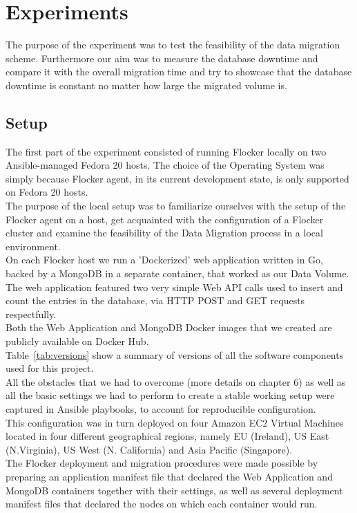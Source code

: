 \documentclass{article}
\begin{document}
\clearpage
\section{Experiments}
The purpose of the experiment was to test the feasibility of the data migration scheme. Furthermore our aim was to measure the database downtime and compare it with the overall migration time and try to showcase that the database downtime is constant no matter how large the migrated volume is.

\subsection{Setup}
The first part of the experiment consisted of running Flocker locally on two Ansible-managed Fedora 20 hosts. The choice of the Operating System was simply because Flocker agent, in its current development state, is only supported on Fedora 20 hosts.\\
The purpose of the local setup was to familiarize ourselves with the setup of the Flocker agent on a host, get acquainted with the configuration of a Flocker cluster and examine the feasibility of the Data Migration process in a local environment. \\
On each Flocker host we run a 'Dockerized' web application written in Go, backed by a MongoDB in a separate container, that worked as our Data Volume.\\
The web application featured two very simple Web API calls used to insert and count the entries in the database, via HTTP POST and GET requests respectfully.\\
Both the Web Application and MongoDB Docker images that we created are publicly available on Docker Hub.\\
Table~\ref{tab:versions} show a summary of versions of all the software components used for this project.\\
All the obstacles that we had to overcome (more details on chapter 6) as well as all the basic settings we had to perform to create a stable working setup were captured in Ansible playbooks, to account for reproducible configuration.\\
This configuration was in turn deployed on four Amazon EC2 \cite{ec2} Virtual Machines located in four different geographical regions, namely EU (Ireland), US East (N.Virginia), US West (N. California) and Asia Pacific (Singapore).\\
The Flocker deployment and migration procedures were made possible by preparing an application manifest file that declared the Web Application and MongoDB containers together with their settings, as well as several deployment manifest files that declared the nodes on which each container would run.\\
\end{document}
